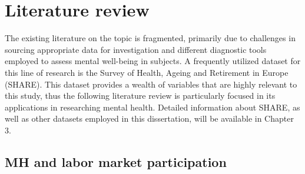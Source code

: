 \section{Literature review}
    The existing literature on the topic is fragmented, primarily due to challenges in sourcing appropriate data for investigation and different diagnostic tools employed to assess mental well-being in subjects. 
    A frequently utilized dataset for this line of research is the Survey of Health, Ageing and Retirement in Europe (SHARE). This dataset provides a wealth of variables that are highly relevant to this study, thus the following literature review is particularly focused in its applications in researching mental health. Detailed information about SHARE, as well as other datasets employed in this dissertation, will be available in Chapter 3.

    \subsection{MH and labor market participation}


